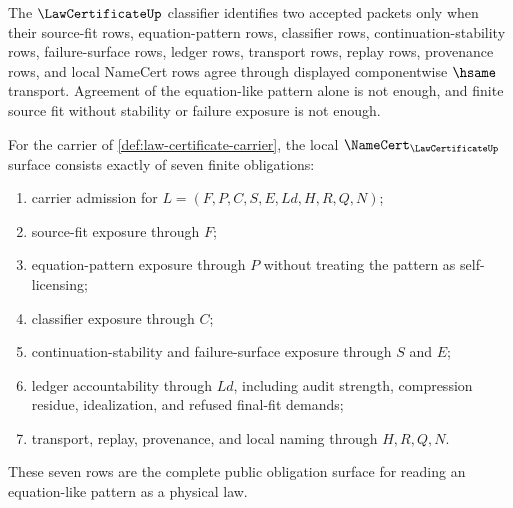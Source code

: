 \begin{definition}
\label{def:law-certificate-classifier}
The $\LawCertificateUp$ classifier identifies two accepted packets only when their source-fit rows, equation-pattern rows, classifier rows, continuation-stability rows, failure-surface rows, ledger rows, transport rows, replay rows, provenance rows, and local NameCert rows agree through displayed componentwise $\hsame$ transport. Agreement of the equation-like pattern alone is not enough, and finite source fit without stability or failure exposure is not enough.
\end{definition}

\begin{theorem}
\label{thm:law-certificate-namecert-obligations}
For the carrier of \autoref{def:law-certificate-carrier}, the local $\NameCert_{\LawCertificateUp}$ surface consists exactly of seven finite obligations:
\begin{enumerate}
\item carrier admission for $L=(F,P,C,S,E,Ld,H,R,Q,N)$;
\item source-fit exposure through $F$;
\item equation-pattern exposure through $P$ without treating the pattern as self-licensing;
\item classifier exposure through $C$;
\item continuation-stability and failure-surface exposure through $S$ and $E$;
\item ledger accountability through $Ld$, including audit strength, compression residue, idealization, and refused final-fit demands;
\item transport, replay, provenance, and local naming through $H,R,Q,N$.
\end{enumerate}
These seven rows are the complete public obligation surface for reading an equation-like pattern as a physical law.
\end{theorem}
